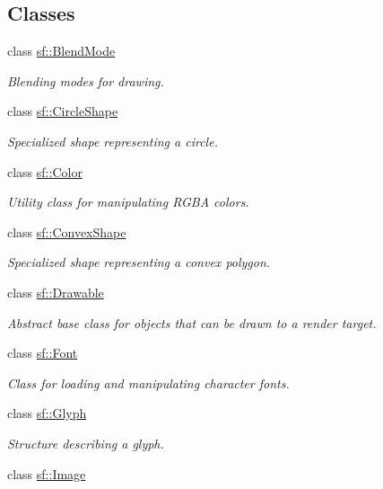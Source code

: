 \subsection*{Classes}
\begin{DoxyCompactItemize}
\item 
class \hyperlink{structsf_1_1_blend_mode}{sf\+::\+Blend\+Mode}
\begin{DoxyCompactList}\small\item\em Blending modes for drawing. \end{DoxyCompactList}\item 
class \hyperlink{classsf_1_1_circle_shape}{sf\+::\+Circle\+Shape}
\begin{DoxyCompactList}\small\item\em Specialized shape representing a circle. \end{DoxyCompactList}\item 
class \hyperlink{classsf_1_1_color}{sf\+::\+Color}
\begin{DoxyCompactList}\small\item\em Utility class for manipulating R\+G\+BA colors. \end{DoxyCompactList}\item 
class \hyperlink{classsf_1_1_convex_shape}{sf\+::\+Convex\+Shape}
\begin{DoxyCompactList}\small\item\em Specialized shape representing a convex polygon. \end{DoxyCompactList}\item 
class \hyperlink{classsf_1_1_drawable}{sf\+::\+Drawable}
\begin{DoxyCompactList}\small\item\em Abstract base class for objects that can be drawn to a render target. \end{DoxyCompactList}\item 
class \hyperlink{classsf_1_1_font}{sf\+::\+Font}
\begin{DoxyCompactList}\small\item\em Class for loading and manipulating character fonts. \end{DoxyCompactList}\item 
class \hyperlink{classsf_1_1_glyph}{sf\+::\+Glyph}
\begin{DoxyCompactList}\small\item\em Structure describing a glyph. \end{DoxyCompactList}\item 
class \hyperlink{classsf_1_1_image}{sf\+::\+Image}

\end{DoxyCompactItemize}
